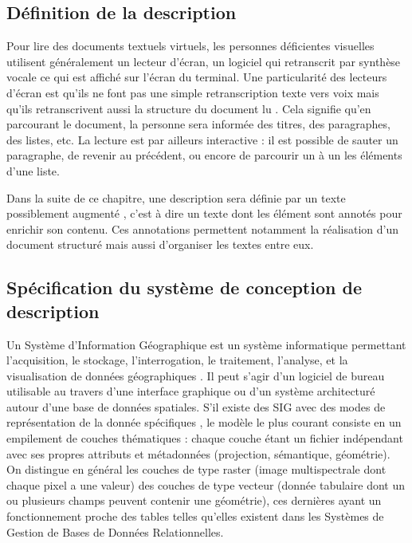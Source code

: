 \subsection{Définition de la description}

Pour lire des documents textuels virtuels, les personnes déficientes visuelles utilisent généralement un lecteur d’écran, un logiciel qui retranscrit par synthèse vocale ce qui est affiché sur l’écran du terminal. Une particularité des lecteurs d’écran est qu’ils ne font pas une simple retranscription texte vers voix mais qu’ils retranscrivent aussi la structure du document lu \missref{}. Cela signifie qu’en parcourant le document, la personne sera informée des titres, des paragraphes, des listes, etc. La lecture est par ailleurs interactive : il est possible de sauter un paragraphe, de revenir au précédent, ou encore de parcourir un à un les éléments d’une liste.

\newpar{}

Dans la suite de ce chapitre, une description sera définie par un texte possiblement augmenté \missref{}, c’est à dire un texte dont les élément sont annotés pour enrichir son contenu. Ces annotations permettent notamment la réalisation d’un document structuré mais aussi d’organiser les textes entre eux.

\subsection{Spécification du système de conception de description}

Un Système d’Information Géographique est un système informatique permettant l’acquisition, le stockage, l’interrogation, le traitement, l’analyse, et la visualisation de données géographiques \cite{AschanLeygonie2019}. Il peut s’agir d’un logiciel de bureau utilisable au travers d’une interface graphique ou d’un système architecturé autour d’une base de données spatiales. S’il existe des SIG avec des modes de représentation de la donnée spécifiques \missref{}, le modèle le plus courant consiste en un empilement de couches thématiques : chaque couche étant un fichier indépendant avec ses propres attributs et métadonnées (projection, sémantique, géométrie). On distingue en général les couches de type raster (image multispectrale dont chaque pixel a une valeur) des couches de type vecteur (donnée tabulaire dont un ou plusieurs champs peuvent contenir une géométrie), ces dernières ayant un fonctionnement proche des tables telles qu’elles existent dans les Systèmes de Gestion de Bases de Données Relationnelles. 

